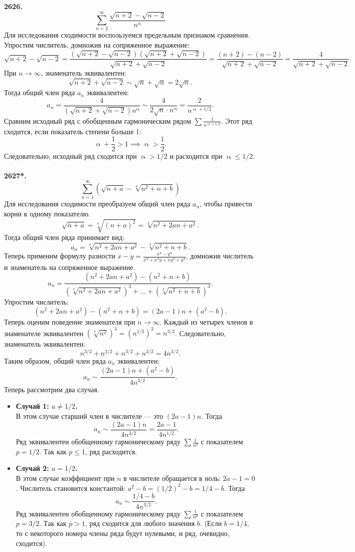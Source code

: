 \documentclass[a4paper, 12pt]{report}
\numberwithin{equation}{section}
\renewcommand{\alpha}{\upalpha}
\begin{document}
	\\\\
	\textbf{2626.}
	$$\sum_{n=2}^{\infty} \frac{\sqrt{n+2}-\sqrt{n-2}}{n^\alpha}$$
	Для исследования сходимости воспользуемся предельным признаком сравнения. Упростим числитель, домножив на сопряженное выражение:
	$$ \sqrt{n+2}-\sqrt{n-2} = \frac{(\sqrt{n+2}-\sqrt{n-2})(\sqrt{n+2}+\sqrt{n-2})}{\sqrt{n+2}+\sqrt{n-2}} = \frac{(n+2)-(n-2)}{\sqrt{n+2}+\sqrt{n-2}} = \frac{4}{\sqrt{n+2}+\sqrt{n-2}}. $$
	При $n \to \infty$, знаменатель эквивалентен:
	$$ \sqrt{n+2}+\sqrt{n-2} \sim \sqrt{n}+\sqrt{n} = 2\sqrt{n}. $$
	Тогда общий член ряда $a_n$ эквивалентен:
	$$ a_n = \frac{4}{(\sqrt{n+2}+\sqrt{n-2})n^\alpha} \sim \frac{4}{2\sqrt{n} \cdot n^\alpha} = \frac{2}{n^{\alpha+1/2}}. $$
	Сравним исходный ряд с обобщенным гармоническим рядом $\sum \frac{1}{n^{\alpha+1/2}}$. Этот ряд сходится, если показатель степени больше 1:
	$$ \alpha + \frac{1}{2} > 1 \implies \alpha > \frac{1}{2}. $$
	Следовательно, исходный ряд сходится при $\alpha > 1/2$ и расходится при $\alpha \le 1/2$.
	\\\\
	\textbf{2627*.}
	$$\sum_{n=1}^{\infty} \left(\sqrt{n+a} - \sqrt[4]{n^2+n+b}\right)$$
	Для исследования сходимости преобразуем общий член ряда $a_n$, чтобы привести корни к одному показателю.
	$$ \sqrt{n+a} = \sqrt[4]{(n+a)^2} = \sqrt[4]{n^2+2an+a^2}. $$
	Тогда общий член ряда принимает вид:
	$$ a_n = \sqrt[4]{n^2+2an+a^2} - \sqrt[4]{n^2+n+b}. $$
	Теперь применим формулу разности $x-y = \frac{x^4-y^4}{x^3+x^2y+xy^2+y^3}$, домножив числитель и знаменатель на сопряженное выражение.
	$$ a_n = \frac{(n^2+2an+a^2) - (n^2+n+b)}{(\sqrt[4]{n^2+2an+a^2})^3 + \dots + (\sqrt[4]{n^2+n+b})^3}. $$
	Упростим числитель:
	$$ (n^2+2an+a^2) - (n^2+n+b) = (2a-1)n + (a^2-b). $$
	Теперь оценим поведение знаменателя при $n \to \infty$. Каждый из четырех членов в знаменателе эквивалентен $(\sqrt[4]{n^2})^3 = (n^{1/2})^3 = n^{3/2}$.
	Следовательно, знаменатель эквивалентен:
	$$ n^{3/2} + n^{3/2} + n^{3/2} + n^{3/2} = 4n^{3/2}. $$
	Таким образом, общий член ряда $a_n$ эквивалентен:
	$$ a_n \sim \frac{(2a-1)n + (a^2-b)}{4n^{3/2}}. $$
	Теперь рассмотрим два случая.
	\begin{itemize}
		\item \textbf{Случай 1: $a \neq 1/2$.}\\
		В этом случае старший член в числителе — это $(2a-1)n$. Тогда
		$$ a_n \sim \frac{(2a-1)n}{4n^{3/2}} = \frac{2a-1}{4n^{1/2}}. $$
		Ряд эквивалентен обобщенному гармоническому ряду $\sum \frac{1}{n^p}$ с показателем $p=1/2$. Так как $p \le 1$, ряд расходится.
		
		\item \textbf{Случай 2: $a = 1/2$.}\\
		В этом случае коэффициент при $n$ в числителе обращается в ноль: $2a-1 = 0$. Числитель становится константой: $a^2-b = (1/2)^2 - b = 1/4 - b$. Тогда
		$$ a_n \sim \frac{1/4-b}{4n^{3/2}}. $$
		Ряд эквивалентен обобщенному гармоническому ряду $\sum \frac{1}{n^p}$ с показателем $p=3/2$. Так как $p > 1$, ряд сходится для любого значения $b$. (Если $b=1/4$, то с некоторого номера члены ряда будут нулевыми, и ряд, очевидно, сходится).
	\end{itemize}
\end{document}
